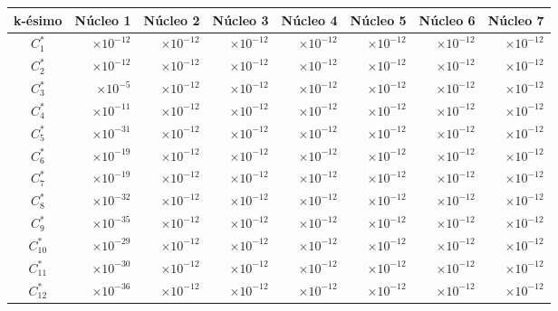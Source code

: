 \begin{center}
\begin{tabular}[h]{|c|r|r|r|r|r|r|r|}
    \hline
    k-ésimo & \multicolumn{1}{c|}{Núcleo 1} & \multicolumn{1}{c|}{Núcleo 2} & \multicolumn{1}{c|}{Núcleo 3} & \multicolumn{1}{c|}{Núcleo 4} & \multicolumn{1}{c|}{Núcleo 5} & \multicolumn{1}{c|}{Núcleo 6} & \multicolumn{1}{c|}{Núcleo 7} \\\hline\hline
    $C_1^*$ & $\times 10^{-12}$ & $\times 10^{-12}$ & $\times 10^{-12}$ & $\times 10^{-12}$ & $\times 10^{-12}$ & $\times 10^{-12}$ & $\times 10^{-12}$ \\
    $C_2^*$ & $\times 10^{-12}$& $\times 10^{-12}$ & $\times 10^{-12}$ & $\times 10^{-12}$ & $\times 10^{-12}$ & $\times 10^{-12}$ & $\times 10^{-12}$ \\
    $C_3^*$ & $\times 10^{-5}$& $\times 10^{-12}$ & $\times 10^{-12}$ & $\times 10^{-12}$ & $\times 10^{-12}$ & $\times 10^{-12}$ & $\times 10^{-12}$ \\
    $C_4^*$ & $\times 10^{-11}$& $\times 10^{-12}$ & $\times 10^{-12}$ & $\times 10^{-12}$ & $\times 10^{-12}$ & $\times 10^{-12}$ & $\times 10^{-12}$ \\
    $C_5^*$ & $\times 10^{-31}$& $\times 10^{-12}$ & $\times 10^{-12}$ & $\times 10^{-12}$ & $\times 10^{-12}$ & $\times 10^{-12}$ & $\times 10^{-12}$ \\
    $C_6^*$ & $\times 10^{-19}$& $\times 10^{-12}$ & $\times 10^{-12}$ & $\times 10^{-12}$ & $\times 10^{-12}$ & $\times 10^{-12}$ & $\times 10^{-12}$  \\
    $C_7^*$ & $\times 10^{-19}$& $\times 10^{-12}$ & $\times 10^{-12}$ & $\times 10^{-12}$ & $\times 10^{-12}$ & $\times 10^{-12}$ & $\times 10^{-12}$  \\
    $C_8^*$ & $\times 10^{-32}$& $\times 10^{-12}$ & $\times 10^{-12}$ & $\times 10^{-12}$ & $\times 10^{-12}$ & $\times 10^{-12}$ & $\times 10^{-12}$  \\
    $C_9^*$ &  $\times 10^{-35}$& $\times 10^{-12}$ & $\times 10^{-12}$ & $\times 10^{-12}$ & $\times 10^{-12}$ & $\times 10^{-12}$ & $\times 10^{-12}$ \\
    $C_{10}^*$ & $\times 10^{-29}$& $\times 10^{-12}$ & $\times 10^{-12}$ & $\times 10^{-12}$ & $\times 10^{-12}$ & $\times 10^{-12}$ & $\times 10^{-12}$ \\
    $C_{11}^*$ & $\times 10^{-30}$& $\times 10^{-12}$ & $\times 10^{-12}$ & $\times 10^{-12}$ & $\times 10^{-12}$ & $\times 10^{-12}$ & $\times 10^{-12}$  \\
    $C_{12}^*$ & $\times 10^{-36}$& $\times 10^{-12}$ & $\times 10^{-12}$ & $\times 10^{-12}$ & $\times 10^{-12}$ & $\times 10^{-12}$ & $\times 10^{-12}$  \\

\end{tabular}
\end{center}
